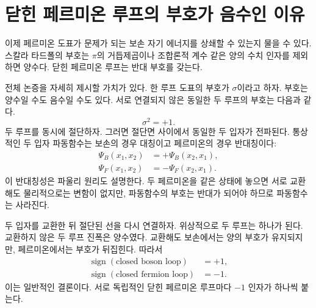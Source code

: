 \section{닫힌 페르미온 루프의 부호가 음수인 이유}

이제 페르미온 도표가 문제가 되는 보손 자기 에너지를 상쇄할 수 있는지 물을 수 있다. 스칼라 타드폴의 부호는 \(\pi\)의 거듭제곱이나 조합론적 계수 같은 양의 수치 인자를 제외하면 양수다. 닫힌 페르미온 루프는 반대 부호를 갖는다.

\begin{classroomqa}
\end{classroomqa}

전체 논증을 자세히 제시할 가치가 있다. 한 루프 도표의 부호가 \(\sigma\)이라고 하자. 부호는 양수일 수도 음수일 수도 있다. 서로 연결되지 않은 동일한 두 루프의 부호는 다음과 같다.
\begin{equation}
\sigma^2=+1.
\end{equation}
두 루프를 동시에 절단하자. 그러면 절단면 사이에서 동일한 두 입자가 전파된다. 통상적인 두 입자 파동함수는 보손의 경우 대칭이고 페르미온의 경우 반대칭이다:
\begin{align}
\Psi_B(x_1,x_2)&=+\Psi_B(x_2,x_1),\\
\Psi_F(x_1,x_2)&=-\Psi_F(x_2,x_1).
\end{align}
이 반대칭성은 파울리 원리도 설명한다. 두 페르미온을 같은 상태에 놓으면 서로 교환해도 물리적으로는 변함이 없지만, 파동함수의 부호는 반대가 되어야 하므로 파동함수는 사라진다.

두 입자를 교환한 뒤 절단된 선을 다시 연결하자. 위상적으로 두 루프는 하나가 된다. 교환하지 않은 두 루프 진폭은 양수였다. 교환해도 보손에서는 양의 부호가 유지되지만, 페르미온에서는 부호가 뒤집힌다. 따라서
\begin{equation}
\begin{aligned}
\operatorname{sign}(\text{closed boson loop})&=+1,\\
\operatorname{sign}(\text{closed fermion loop})&=-1.
\end{aligned}
\end{equation}
이는 일반적인 결론이다. 서로 독립적인 닫힌 페르미온 루프마다 \(-1\) 인자가 하나씩 붙는다.

